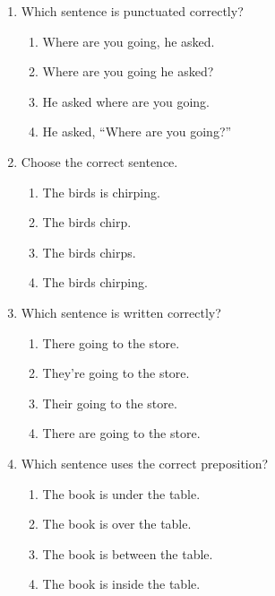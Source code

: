 \documentclass[12pt]{article}
\begin{document}
\begin{enumerate}
    \vspace{0.5cm}

    \item Which sentence is punctuated correctly?

    \begin{enumerate}[label=\Alph*.]
        \item Where are you going, he asked.
        \item Where are you going he asked?
        \item He asked where are you going.
        \item He asked, “Where are you going?”
    \end{enumerate}

    \vspace{0.5cm}

    \item Choose the correct sentence.

    \begin{enumerate}[label=\Alph*.]
        \item The birds is chirping.
        \item The birds chirp.
        \item The birds chirps.
        \item The birds chirping.
    \end{enumerate}

    \vspace{0.5cm}

    \item Which sentence is written correctly?

    \begin{enumerate}[label=\Alph*.]
        \item There going to the store.
        \item They’re going to the store.
        \item Their going to the store.
        \item There are going to the store.
    \end{enumerate}

    \vspace{0.5cm}

    \item Which sentence uses the correct preposition?

    \begin{enumerate}[label=\Alph*.]
        \item The book is under the table.
        \item The book is over the table.
        \item The book is between the table.
        \item The book is inside the table.
    \end{enumerate}


\end{enumerate}
\end{document}
